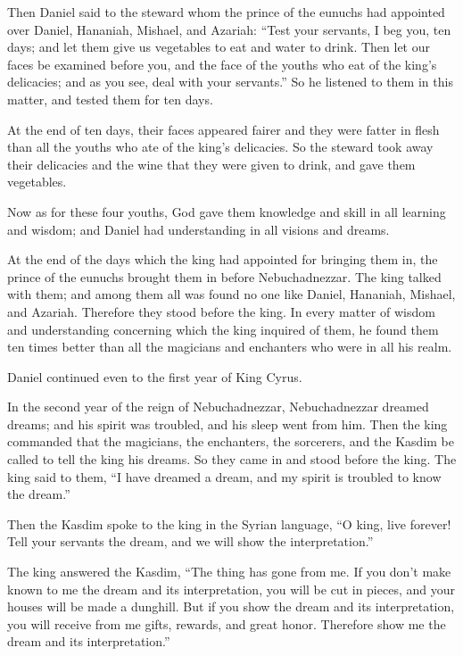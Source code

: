 \myverse{}Then Daniel said to the steward whom the prince of the eunuchs had appointed over Daniel, Hananiah, Mishael, and Azariah: \myverse{}“Test your servants, I beg you, ten days; and let them give us vegetables to eat and water to drink. \myverse{}Then let our faces be examined before you, and the face of the youths who eat of the king’s delicacies; and as you see, deal with your servants.” \myverse{}So he listened to them in this matter, and tested them for ten days.


\myverse{}At the end of ten days, their faces appeared fairer and they were fatter in flesh than all the youths who ate of the king’s delicacies. \myverse{}So the steward took away their delicacies and the wine that they were given to drink, and gave them vegetables.


\myverse{}Now as for these four youths, God gave them knowledge and skill in all learning and wisdom; and Daniel had understanding in all visions and dreams.


\myverse{}At the end of the days which the king had appointed for bringing them in, the prince of the eunuchs brought them in before Nebuchadnezzar. \myverse{}The king talked with them; and among them all was found no one like Daniel, Hananiah, Mishael, and Azariah. Therefore they stood before the king. \myverse{}In every matter of wisdom and understanding concerning which the king inquired of them, he found them ten times better than all the magicians and enchanters who were in all his realm.


\myverse{}Daniel continued even to the first year of King Cyrus.


\mychapter{} \myverse*{}In the second year of the reign of Nebuchadnezzar, Nebuchadnezzar dreamed dreams; and his spirit was troubled, and his sleep went from him. \myverse{}Then the king commanded that the magicians, the enchanters, the sorcerers, and the Kasdim be called to tell the king his dreams. So they came in and stood before the king. \myverse{}The king said to them, “I have dreamed a dream, and my spirit is troubled to know the dream.”


\myverse{}Then the Kasdim spoke to the king in the Syrian language, “O king, live forever! Tell your servants the dream, and we will show the interpretation.”


\myverse{}The king answered the Kasdim, “The thing has gone from me. If you don’t make known to me the dream and its interpretation, you will be cut in pieces, and your houses will be made a dunghill. \myverse{}But if you show the dream and its interpretation, you will receive from me gifts, rewards, and great honor. Therefore show me the dream and its interpretation.”


